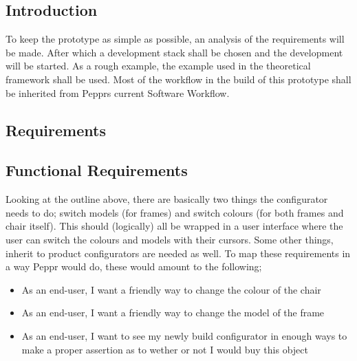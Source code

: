 \subsection{Introduction}
To keep the prototype as simple as possible, an analysis of the requirements will be made. After which a development stack shall be chosen and the development will be started. As a rough example, the example used in the theoretical framework shall be used. Most of the workflow in the build of this prototype shall be inherited from Pepprs current Software Workflow.


\subsection{Requirements}

\subsection{Functional Requirements}
Looking at the outline above, there are basically two things the configurator needs to do; switch models (for frames) and switch colours (for both frames and chair itself). This should (logically) all be wrapped in a user interface where the user can switch the colours and models with their cursors. Some other things, inherit to product configurators are needed as well. To map these requirements in a way Peppr would do, these would amount to the following;

\begin{itemize}
	\item As an end-user, I want a friendly way to change the colour of the chair
	\item As an end-user, I want a friendly way to change the model of the frame
	\item As an end-user, I want to see my newly build configurator in enough ways to make a proper assertion as to wether or not I would buy this object
\end{itemize}


